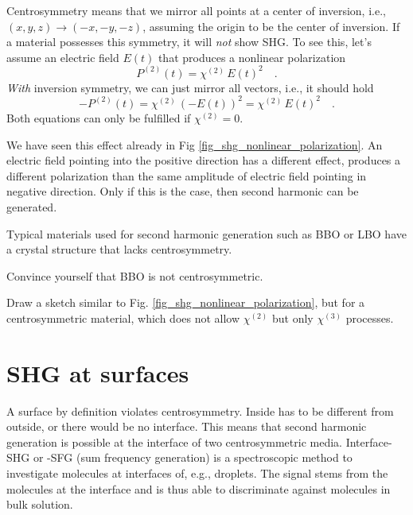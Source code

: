 Centrosymmetry means that we  mirror all points at a center of inversion, i.e., $(x,y,z) \rightarrow (-x, -y, -z)$, assuming the origin to be the center of inversion. If a material possesses  this symmetry, it will \emph{not} show SHG. To see this, let's assume an electric field $E(t)$ that produces a nonlinear polarization
\begin{equation}
P^{(2)}(t) = \chi^{(2)} \, E(t)^2 \quad .
\end{equation}
\emph{With} inversion symmetry, we can just mirror all vectors, i.e., it should hold
\begin{equation}
- P^{(2)}(t) = \chi^{(2)} \, \left( - E(t) \right)^2 = \chi^{(2)} \, E(t)^2  \quad .
\end{equation}
Both equations can only be fulfilled if $ \chi^{(2)} =0$.

We have seen this effect already in Fig \ref{fig_shg_nonlinear_polarization}. An electric field pointing into the positive direction has a different effect, produces a different polarization than the same amplitude of electric field pointing in negative direction. Only if this is the case, then second harmonic can be generated.


Typical materials used for second harmonic generation such as BBO or LBO have a crystal structure that lacks centrosymmetry.

\begin{questions}
\item Convince yourself that BBO is not centrosymmetric.

\item Draw a sketch similar to Fig. \ref{fig_shg_nonlinear_polarization}, but for a centrosymmetric material, which does not allow $\chi^{(2)}$ but only $\chi^{(3)}$  processes.


\end{questions}


\section{SHG at surfaces}

A surface by definition violates centrosymmetry. Inside has to be different from outside, or there would be no interface. This means that second harmonic generation is possible at the interface of two centrosymmetric media. Interface-SHG or -SFG (sum frequency generation) is a spectroscopic method to investigate molecules at interfaces of, e.g., droplets. The signal stems from the molecules at the interface and is thus able to discriminate against molecules in bulk solution.


